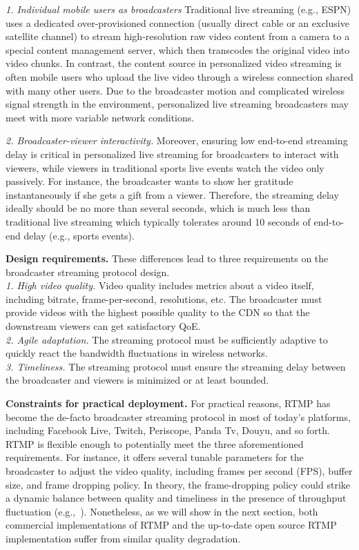 {\em 1. Individual mobile users as broadcasters}
Traditional live streaming (e.g., ESPN) uses a dedicated
over-provisioned connection (usually direct cable or an exclusive
satellite channel) to stream high-resolution raw video
content from a camera to a special content management
server, which then transcodes the original video into video chunks.
In contrast, the content source in personalized video
streaming is often mobile users who upload the live video
through a wireless connection shared with many other users. Due to the broadcaster motion and complicated wireless signal strength in the environment, personalized live streaming broadcasters may meet with more variable network conditions.

{\em 2. Broadcaster-viewer interactivity.}
Moreover, ensuring low end-to-end streaming delay is critical
in personalized live streaming for broadcasters
to interact with viewers, while viewers in traditional sports live
events watch the video only passively.
For instance, the broadcaster wants to show her gratitude 
instantaneously if she gets a gift from a viewer.
Therefore, the streaming delay ideally should be no more than
several seconds, which is much less than traditional live
streaming which typically tolerates around 10 seconds of end-to-end 
delay (e.g., sports events).

\textbf{Design requirements.} These differences lead to three requirements on the broadcaster streaming protocol design.\\
{\em 1. High video quality.} Video quality includes metrics about a video itself, including bitrate, frame-per-second, resolutions, etc. The broadcaster must provide videos with the highest possible quality to the CDN so that the downstream viewers can get satisfactory QoE.\\
{\em 2. Agile adaptation.} The streaming protocol must be sufficiently adaptive to quickly react the bandwidth fluctuations in wireless networks.\\
{\em 3. Timeliness.} The streaming protocol must ensure the streaming delay between the broadcaster and viewers is minimized
or at least bounded.

\textbf{Constraints for practical deployment.}
For practical reasons, RTMP has become the de-facto
broadcaster streaming protocol in most of today's platforms,
including Facebook Live, Twitch, Periscope, Panda Tv,
Douyu, and so forth.
RTMP is flexible enough to potentially meet
the three aforementioned requirements.
For instance, it offers several tunable parameters for
the broadcaster to adjust the video quality, including
frames per second (FPS), buffer size, and frame dropping
policy.
In theory, the frame-dropping policy could
strike a dynamic balance between quality and timeliness
in the presence of throughput fluctuation
(e.g.,~\cite{huang2003adaptive,krasic2003quality,singh2004dynamic}).
Nonetheless, as we will show in the next section,
both commercial implementations of RTMP and
the up-to-date open source RTMP implementation suffer from similar quality degradation.

